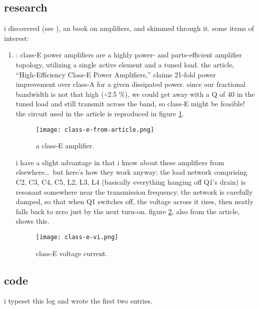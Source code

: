 \subsection*{research}
i discovered \autocite{rf-amp-classics} (see ),
an \arrl book on \rf amplifiers, and skimmed through it. some items of
interest:
\begin{enumerate}
	\item \autocite[p.~1 dash 41]{rf-amp-classics}: class-E power
	amplifiers are a highly power- and parts-efficient amplifier topology,
	utilizing a single active element and a tuned load. the article,
	``High-Efficiency Class-E Power Amplifiers,'' claims 21-fold power
	improvement over class-A for a given dissipated power. since our
	fractional bandwidth is not that high (\textasciitilde 2.5 \%), we
	could get away with a Q of 40 in the tuned load and still transmit
	across the band, so class-E might be feasible! the circuit used in the
	article is reproduced in figure \ref{fig:class-e-from-article}.

	\begin{figure}[H]
		\centering
		\texttt{[image: class-e-from-article.png]}
		\caption{a class-E amplifier.}
		\label{fig:class-e-from-article}
	\end{figure}

	i have a slight advantage in that i know about these amplifiers from
	elsewhere\ldots\ but here's how they work anyway: the load network
	comprising C2, C3, C4, C5, L2, L3, \amp L4 (basically everything
	hanging off Q1's drain) is resonant somewhere near the transmission
	frequency. the network is carefully damped, so that when Q1 switches
	off, the voltage across it rises, then neatly falls back to zero just
	by the next turn-on. figure \ref{fig:class-e-vi}, also from the
	article, shows this.

	\begin{figure}[H]
		\centering
		\texttt{[image: class-e-vi.png]}
		\caption{class-E voltage \amp current.}
		\label{fig:class-e-vi}
	\end{figure}

\end{enumerate}

\subsection*{code}
i typeset this log and wrote the first two entries.
